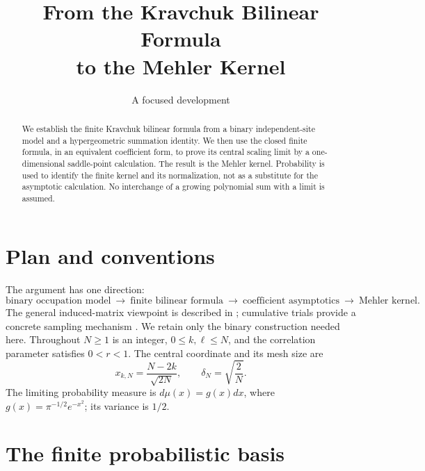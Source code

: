 \documentclass[11pt,reqno]{amsart}
\title[Kravchuk Bilinear Formula and the Mehler Limit]{From the Kravchuk Bilinear Formula\\to the Mehler Kernel}
\date{A focused development}
\theoremstyle{remark}\newtheorem{remark}[theorem]{Remark}
\begin{document}
\begin{abstract}
We establish the finite Kravchuk bilinear formula from a binary
independent-site model and a hypergeometric summation identity. We
then use the closed finite formula, in an equivalent coefficient form,
to prove its central scaling limit by a one-dimensional saddle-point
calculation. The result is the Mehler kernel. Probability is used to
identify the finite kernel and its normalization, not as a substitute
for the asymptotic calculation. No interchange of a growing polynomial
sum with a limit is assumed.
\end{abstract}
\maketitle
\section*{Plan and conventions}
The argument has one direction:
\[
\text{binary occupation model}
\ \longrightarrow\ \text{finite bilinear formula}
\ \longrightarrow\ \text{coefficient asymptotics}
\ \longrightarrow\ \text{Mehler kernel}.
\]
The general induced-matrix viewpoint is described in
\cite{FeinsilverSFAII2023}; cumulative trials provide a concrete
sampling mechanism \cite{HoareRahman1984}. We retain only the binary
construction needed here. Throughout $N\ge1$ is an integer,
$0\le k,\ell\le N$, and the correlation parameter satisfies $0<r<1$.
The central coordinate and its mesh size are
\begin{equation}\label{eq:coordinates}
x_{k,N}=\frac{N-2k}{\sqrt{2N}},\qquad
\delta_N=\sqrt{\frac2N}.
\end{equation}
The limiting probability measure is
$d\mu(x)=g(x)dx$, where $g(x)=\pi^{-1/2}e^{-x^2}$; its variance is $1/2$.

\section{The finite probabilistic basis}
\end{document}
